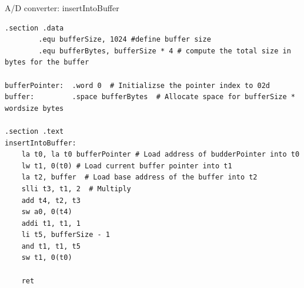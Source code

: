 \begin{parag}{A/D converter: insertIntoBuffer}
	\begin{lstlisting}[language={[RISC-V]Assembler}]
.section .data 	
		.equ bufferSize, 1024 #define buffer size 
		.equ bufferBytes, bufferSize * 4 # compute the total size in bytes for the buffer 

bufferPointer: 	.word 0  # Initializse the pointer index to 02d
buffer: 		.space bufferBytes  # Allocate space for bufferSize * wordsize bytes

.section .text 
insertIntoBuffer: 	
	la t0, la t0 bufferPointer # Load address of budderPointer into t0
	lw t1, 0(t0) # Load current buffer pointer into t1
	la t2, buffer  # Load base address of the buffer into t2
	slli t3, t1, 2  # Multiply
	add t4, t2, t3 
	sw a0, 0(t4)
	addi t1, t1, 1 
	li t5, bufferSize - 1 
	and t1, t1, t5 
	sw t1, 0(t0)

	ret
\end{lstlisting}
\end{parag}








